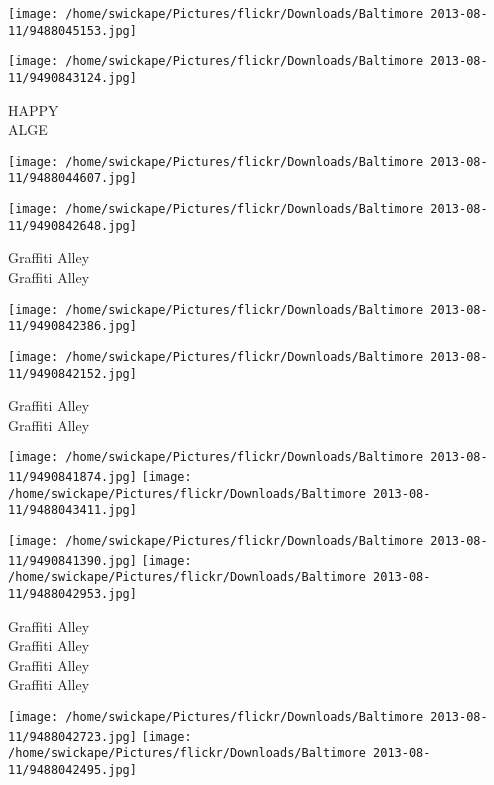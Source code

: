 \documentclass[10pt,letterpaper]{article}
\begin{document}
\texttt{[image: /home/swickape/Pictures/flickr/Downloads/Baltimore 2013-08-11/9488045153.jpg]}

\vspace{0.25in}
\texttt{[image: /home/swickape/Pictures/flickr/Downloads/Baltimore 2013-08-11/9490843124.jpg]}

HAPPY\\
ALGE\\
\pagebreak

\texttt{[image: /home/swickape/Pictures/flickr/Downloads/Baltimore 2013-08-11/9488044607.jpg]}

\vspace{0.25in}
\texttt{[image: /home/swickape/Pictures/flickr/Downloads/Baltimore 2013-08-11/9490842648.jpg]}

Graffiti Alley\\
Graffiti Alley\\
\pagebreak

\texttt{[image: /home/swickape/Pictures/flickr/Downloads/Baltimore 2013-08-11/9490842386.jpg]}

\vspace{0.25in}
\texttt{[image: /home/swickape/Pictures/flickr/Downloads/Baltimore 2013-08-11/9490842152.jpg]}

Graffiti Alley\\
Graffiti Alley\\
\pagebreak

\texttt{[image: /home/swickape/Pictures/flickr/Downloads/Baltimore 2013-08-11/9490841874.jpg]}
\texttt{[image: /home/swickape/Pictures/flickr/Downloads/Baltimore 2013-08-11/9488043411.jpg]}

\texttt{[image: /home/swickape/Pictures/flickr/Downloads/Baltimore 2013-08-11/9490841390.jpg]}
\texttt{[image: /home/swickape/Pictures/flickr/Downloads/Baltimore 2013-08-11/9488042953.jpg]}

Graffiti Alley\\
Graffiti Alley\\
Graffiti Alley\\
Graffiti Alley\\
\pagebreak

\texttt{[image: /home/swickape/Pictures/flickr/Downloads/Baltimore 2013-08-11/9488042723.jpg]}
\texttt{[image: /home/swickape/Pictures/flickr/Downloads/Baltimore 2013-08-11/9488042495.jpg]}
\end{document}
